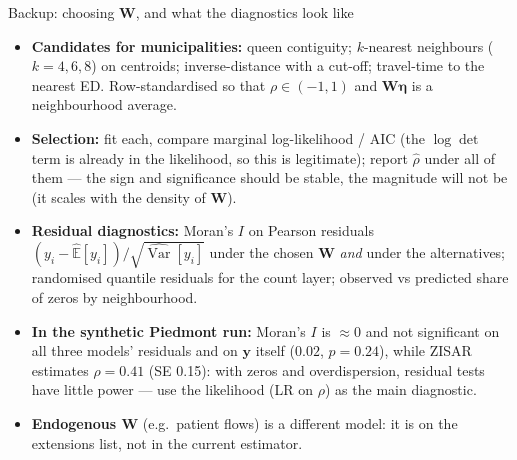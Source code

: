 \documentclass[10pt,aspectratio=169]{beamer}
\newcommand{\E}{\mathbb{E}}
\newcommand{\bW}{\mathbf{W}}
\newcommand{\by}{\mathbf{y}}
\DeclareMathOperator{\Var}{Var}
\begin{document}
\begin{frame}{Backup: choosing $\bW$, and what the diagnostics look like}
  \small
  \begin{itemize}\setlength{\itemsep}{0.45em}
    \item \textbf{Candidates for municipalities:} queen contiguity; $k$-nearest neighbours ($k=4,6,8$) on centroids; inverse-distance with a cut-off; travel-time to the nearest ED. Row-standardised so that $\rho\in(-1,1)$ and $\bW\boldsymbol\eta$ is a neighbourhood average.
    \item \textbf{Selection:} fit each, compare marginal log-likelihood / AIC (the $\log\det$ term is already in the likelihood, so this is legitimate); report $\hat\rho$ under all of them --- the sign and significance should be stable, the magnitude will not be (it scales with the density of $\bW$).
    \item \textbf{Residual diagnostics:} Moran's $I$ on Pearson residuals $(y_i-\hat{\E}[y_i])/\sqrt{\widehat{\Var}[y_i]}$ under the chosen $\bW$ \emph{and} under the alternatives; randomised quantile residuals for the count layer; observed vs predicted share of zeros by neighbourhood.
    \item \textbf{In the synthetic Piedmont run:} Moran's $I$ is $\approx0$ and not significant on all three models' residuals and on $\by$ itself ($0.02$, $p=0.24$), while ZISAR estimates $\hat\rho=0.41$ (SE 0.15): with zeros and overdispersion, residual tests have little power --- use the likelihood (LR on $\rho$) as the main diagnostic.
    \item \textbf{Endogenous $\bW$} (e.g.\ patient flows) is a different model: it is on the extensions list, not in the current estimator.
  \end{itemize}
\end{frame}
\end{document}
